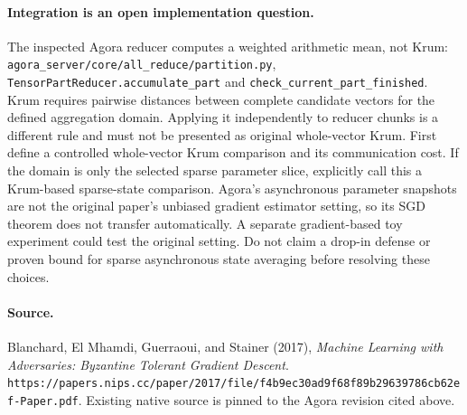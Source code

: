 \paragraph{Integration is an open implementation question.}
The inspected Agora reducer computes a weighted arithmetic mean, not Krum:
\texttt{agora\_server/core/all\_reduce/partition.py},
\texttt{TensorPartReducer.accumulate\_part} and
\texttt{check\_current\_part\_finished}.
Krum requires pairwise distances between complete candidate vectors for the
defined aggregation domain. Applying it independently to reducer chunks is a
different rule and must not be presented as original whole-vector Krum.
First define a controlled whole-vector Krum comparison and its communication cost.
If the domain is only the selected sparse parameter slice, explicitly call this
a Krum-based sparse-state comparison. Agora's asynchronous parameter snapshots
are not the original paper's unbiased gradient estimator setting, so its SGD
theorem does not transfer automatically. A separate gradient-based toy experiment
could test the original setting. Do not claim a drop-in defense or proven bound
for sparse asynchronous state averaging before resolving these choices.

\paragraph{Source.}
Blanchard, El Mhamdi, Guerraoui, and Stainer (2017),
\emph{Machine Learning with Adversaries: Byzantine Tolerant Gradient Descent}.
\texttt{https://papers.nips.cc/paper/2017/file/f4b9ec30ad9f68f89b29639786cb62ef-Paper.pdf}.
Existing native source is pinned to the Agora revision cited above.
